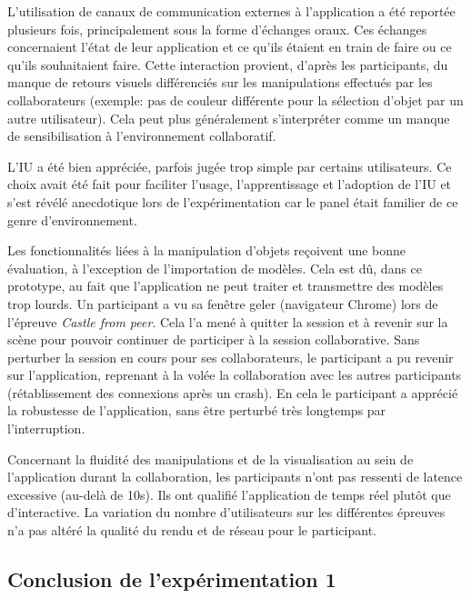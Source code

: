 L'utilisation de canaux de communication 
externes à l'application a été reportée plusieurs fois, principalement sous la forme 
d'échanges oraux. Ces échanges concernaient l'état de leur application et ce qu'ils 
étaient en train de faire ou ce qu'ils souhaitaient faire. Cette interaction provient, 
d'après les participants, du manque de retours visuels différenciés sur les 
manipulations effectués par les collaborateurs (exemple: pas de couleur différente 
pour la sélection d'objet par un autre utilisateur). Cela peut plus généralement 
s'interpréter comme un manque de sensibilisation à l'environnement collaboratif. 


L'\gls{IU} a été bien appréciée, parfois jugée \og trop simple\fg{} par certains 
utilisateurs. Ce choix avait été fait pour faciliter l'usage, l'apprentissage et 
l'adoption de l'\gls{IU} et s'est révélé anecdotique lors de l'expérimentation car le 
panel était familier de ce genre d'environnement.

Les fonctionnalités liées à la manipulation d'objets reçoivent une bonne évaluation, 
à l'exception de l'importation de modèles. Cela est dû, dans ce prototype, au 
fait que l'application ne peut traiter et transmettre des modèles trop lourds. Un 
participant a vu sa fenêtre \og geler\fg{} (navigateur Chrome) lors de l'épreuve 
\textit{Castle from peer}. Cela l'a mené à quitter la session et à revenir sur la 
scène pour pouvoir continuer de participer à la session collaborative. Sans 
perturber la session en cours pour ses collaborateurs, le participant a pu revenir sur 
l'application, reprenant à la volée la collaboration avec les autres participants 
(rétablissement 
des connexions après un crash). En cela le participant a apprécié la robustesse de 
l'application, sans être perturbé très longtemps par l'interruption.

Concernant la fluidité des manipulations et de la visualisation au sein de 
l'application durant la collaboration, les participants n'ont pas ressenti de latence 
excessive (au-delà de 10s). Ils ont qualifié l'application de \og temps réel\fg{} plutôt 
que d'\og interactive\fg{}. La variation du nombre d'utilisateurs sur les différentes 
épreuves n'a pas altéré la qualité du rendu et de réseau pour le participant.

\subsection{Conclusion de l'expérimentation 1}


